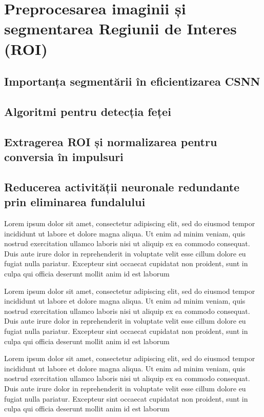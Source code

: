 \chapter{Preprocesarea imaginii și segmentarea Regiunii de Interes (ROI)}
\label{chap:ch3}

\section{Importanța segmentării în eficientizarea CSNN}
\section{Algoritmi pentru detecția feței}
\section{Extragerea ROI și normalizarea pentru conversia în impulsuri}
\section{Reducerea activității neuronale redundante prin eliminarea fundalului}


Lorem ipsum dolor sit amet, consectetur adipiscing elit, sed do eiusmod tempor incididunt ut labore et dolore magna aliqua. Ut enim ad minim veniam, quis nostrud exercitation ullamco laboris nisi ut aliquip ex ea commodo consequat. Duis aute irure dolor in reprehenderit in voluptate velit esse cillum dolore eu fugiat nulla pariatur. Excepteur sint occaecat cupidatat non proident, sunt in culpa qui officia deserunt mollit anim id est laborum

Lorem ipsum dolor sit amet, consectetur adipiscing elit, sed do eiusmod tempor incididunt ut labore et dolore magna aliqua. Ut enim ad minim veniam, quis nostrud exercitation ullamco laboris nisi ut aliquip ex ea commodo consequat. Duis aute irure dolor in reprehenderit in voluptate velit esse cillum dolore eu fugiat nulla pariatur. Excepteur sint occaecat cupidatat non proident, sunt in culpa qui officia deserunt mollit anim id est laborum

Lorem ipsum dolor sit amet, consectetur adipiscing elit, sed do eiusmod tempor incididunt ut labore et dolore magna aliqua. Ut enim ad minim veniam, quis nostrud exercitation ullamco laboris nisi ut aliquip ex ea commodo consequat. Duis aute irure dolor in reprehenderit in voluptate velit esse cillum dolore eu fugiat nulla pariatur. Excepteur sint occaecat cupidatat non proident, sunt in culpa qui officia deserunt mollit anim id est laborum

